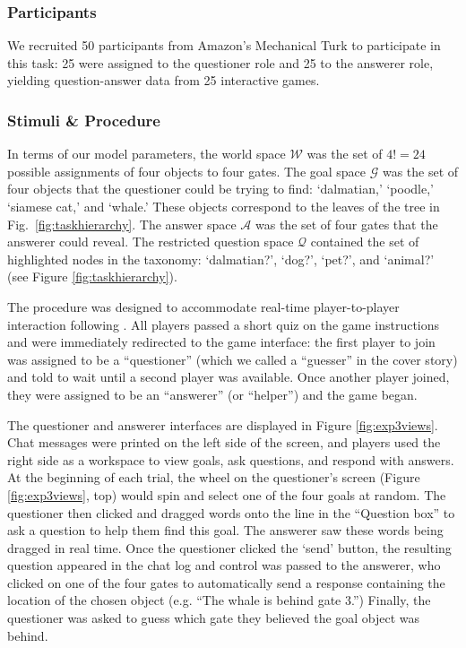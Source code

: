 \documentclass[12pt, floatsintext, jou]{apa6}
\begin{document}
\subsubsection{Participants} We recruited 50 participants
from Amazon's Mechanical Turk to participate in this task: 25 were assigned to the  questioner role and 25 to the answerer role, yielding question-answer data from 25 interactive games.

\subsubsection{Stimuli \& Procedure} In terms of our model parameters, the world space $\mathcal{W}$ was the set of $4! = 24$ possible assignments of four objects to four gates. The goal space $\mathcal{G}$ was the set of four objects that the questioner could be trying to find: `dalmatian,' `poodle,' `siamese cat,' and `whale.' These objects correspond to the leaves of the tree in Fig.~\ref{fig:taskhierarchy}. The answer space $\mathcal{A}$ was the set of four gates that the answerer could  reveal. The restricted question space $\mathcal{Q}$ contained the set of highlighted nodes in the taxonomy: `dalmatian?', `dog?', `pet?', and `animal?' (see Figure \ref{fig:taskhierarchy}). 

The procedure was designed to accommodate real-time player-to-player interaction following . All players passed a short quiz on the game instructions and were immediately redirected to the game interface: the first player to join was assigned to be a ``questioner'' (which we called a ``guesser'' in the cover story) and told to wait until a second player was available. Once another player joined, they were assigned to be an ``answerer'' (or ``helper'') and the game began. 

The questioner and answerer interfaces are displayed in Figure \ref{fig:exp3views}. Chat messages were printed on the left side of the screen, and players used the right side as a workspace to view goals, ask questions, and respond with answers. At the beginning of each trial, the wheel on the questioner's screen (Figure \ref{fig:exp3views}, top) would spin and select one of the four goals at random. The questioner then clicked and dragged words onto the line in the ``Question box'' to ask a question to help them find this goal. The answerer saw these words being dragged in real time. Once the questioner clicked the `send' button, the resulting question appeared in the chat log and control was passed to the answerer, who clicked on one of the four gates to automatically send a response containing the location of the chosen object (e.g. ``The whale is behind gate 3.'') Finally, the questioner was asked to guess which gate they believed the goal object was behind. 
\end{document}
